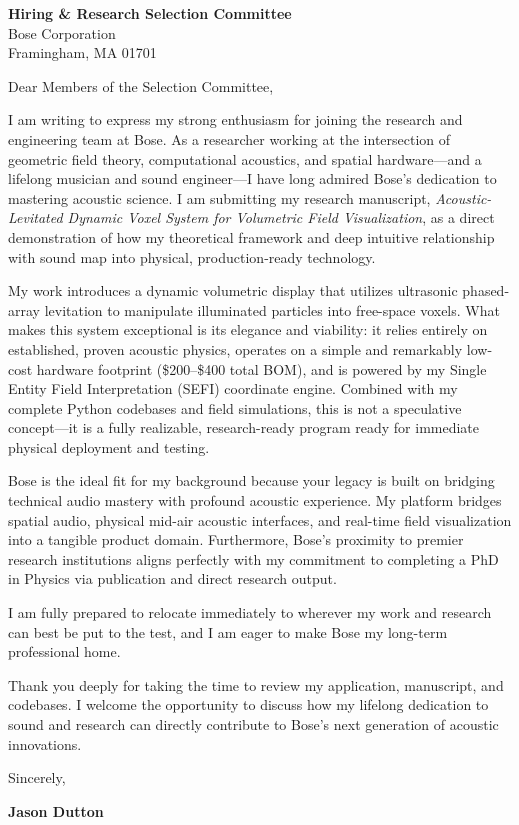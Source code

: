 \documentclass[11pt,letterpaper]{letter}
\date{September 18, 2026}
\begin{document}
\begin{letter}{
    \textbf{Hiring \& Research Selection Committee} \\
    Bose Corporation \\
    Framingham, MA 01701
}

\opening{Dear Members of the Selection Committee,}

I am writing to express my strong enthusiasm for joining the research and engineering team at Bose. As a researcher working at the intersection of geometric field theory, computational acoustics, and spatial hardware—and a lifelong musician and sound engineer—I have long admired Bose's dedication to mastering acoustic science. I am submitting my research manuscript, \textit{Acoustic-Levitated Dynamic Voxel System for Volumetric Field Visualization}, as a direct demonstration of how my theoretical framework and deep intuitive relationship with sound map into physical, production-ready technology.

My work introduces a dynamic volumetric display that utilizes ultrasonic phased-array levitation to manipulate illuminated particles into free-space voxels. What makes this system exceptional is its elegance and viability: it relies entirely on established, proven acoustic physics, operates on a simple and remarkably low-cost hardware footprint (\$200--\$400 total BOM), and is powered by my Single Entity Field Interpretation (SEFI) coordinate engine. Combined with my complete Python codebases and field simulations, this is not a speculative concept—it is a fully realizable, research-ready program ready for immediate physical deployment and testing.

Bose is the ideal fit for my background because your legacy is built on bridging technical audio mastery with profound acoustic experience. My platform bridges spatial audio, physical mid-air acoustic interfaces, and real-time field visualization into a tangible product domain. Furthermore, Bose’s proximity to premier research institutions aligns perfectly with my commitment to completing a PhD in Physics via publication and direct research output.

I am fully prepared to relocate immediately to wherever my work and research can best be put to the test, and I am eager to make Bose my long-term professional home. 

Thank you deeply for taking the time to review my application, manuscript, and codebases. I welcome the opportunity to discuss how my lifelong dedication to sound and research can directly contribute to Bose's next generation of acoustic innovations.

\closing{Sincerely,}

\vspace{0.5cm}
\noindent\textbf{Jason Dutton}

\end{letter}
\end{document}

